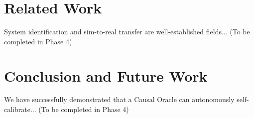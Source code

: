 \documentclass[11pt]{article}
\begin{document}
\section{Related Work}
System identification and sim-to-real transfer are well-established fields... (To be completed in Phase 4)

\section{Conclusion and Future Work}
We have successfully demonstrated that a Causal Oracle can autonomously self-calibrate... (To be completed in Phase 4)



\end{document}
